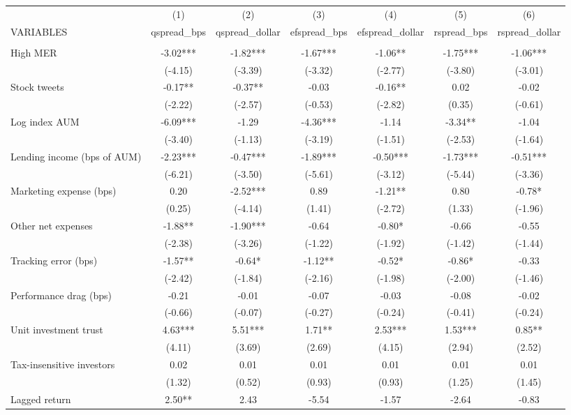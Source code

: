 \documentclass[]{article}
\begin{document}
\begin{tabular}{lcccccc} \hline
 & (1) & (2) & (3) & (4) & (5) & (6) \\
VARIABLES & qspread\_bps & qspread\_dollar & efspread\_bps & efspread\_dollar & rspread\_bps & rspread\_dollar \\ \hline
 &  &  &  &  &  &  \\
High MER & -3.02*** & -1.82*** & -1.67*** & -1.06** & -1.75*** & -1.06*** \\
 & (-4.15) & (-3.39) & (-3.32) & (-2.77) & (-3.80) & (-3.01) \\
Stock tweets & -0.17** & -0.37** & -0.03 & -0.16** & 0.02 & -0.02 \\
 & (-2.22) & (-2.57) & (-0.53) & (-2.82) & (0.35) & (-0.61) \\
Log index AUM & -6.09*** & -1.29 & -4.36*** & -1.14 & -3.34** & -1.04 \\
 & (-3.40) & (-1.13) & (-3.19) & (-1.51) & (-2.53) & (-1.64) \\
Lending income (bps of AUM) & -2.23*** & -0.47*** & -1.89*** & -0.50*** & -1.73*** & -0.51*** \\
 & (-6.21) & (-3.50) & (-5.61) & (-3.12) & (-5.44) & (-3.36) \\
Marketing expense (bps) & 0.20 & -2.52*** & 0.89 & -1.21** & 0.80 & -0.78* \\
 & (0.25) & (-4.14) & (1.41) & (-2.72) & (1.33) & (-1.96) \\
Other net expenses & -1.88** & -1.90*** & -0.64 & -0.80* & -0.66 & -0.55 \\
 & (-2.38) & (-3.26) & (-1.22) & (-1.92) & (-1.42) & (-1.44) \\
Tracking error (bps) & -1.57** & -0.64* & -1.12** & -0.52* & -0.86* & -0.33 \\
 & (-2.42) & (-1.84) & (-2.16) & (-1.98) & (-2.00) & (-1.46) \\
Performance drag (bps) & -0.21 & -0.01 & -0.07 & -0.03 & -0.08 & -0.02 \\
 & (-0.66) & (-0.07) & (-0.27) & (-0.24) & (-0.41) & (-0.24) \\
Unit investment trust & 4.63*** & 5.51*** & 1.71** & 2.53*** & 1.53*** & 0.85** \\
 & (4.11) & (3.69) & (2.69) & (4.15) & (2.94) & (2.52) \\
Tax-insensitive investors & 0.02 & 0.01 & 0.01 & 0.01 & 0.01 & 0.01 \\
 & (1.32) & (0.52) & (0.93) & (0.93) & (1.25) & (1.45) \\
Lagged return & 2.50** & 2.43 & -5.54 & -1.57 & -2.64 & -0.83 \\

\end{tabular}
\end{document}
